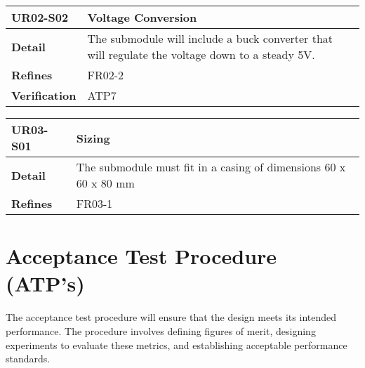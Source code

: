 \documentclass[class=report,11pt,crop=false]{standalone}
\begin{document}
 

\begin{table}
\centering

\begin{tabular}{| l | l |}
\hline
\textbf{UR02-S02} & \textbf{Voltage Conversion} \\
\hline
\textbf{Detail} & The submodule will include a buck converter that will regulate the voltage down to a steady 5V.  \\
\hline
\textbf{Refines} & FR02-2 \\
\hline
\textbf{Verification} & ATP7 \\
\hline

\end{tabular}

\end{table}

 

\begin{table}
\centering

\begin{tabular}{| l | l |}
\hline
\textbf{UR03-S01} & \textbf{Sizing} \\
\hline
\textbf{Detail} & The submodule must fit in a casing of dimensions 60 x 60 x 80 mm \\
\hline
\textbf{Refines} & FR03-1 \\
\hline

\end{tabular}

\end{table}

\section{Acceptance Test Procedure (ATP’s)}

The acceptance test procedure will ensure that the design meets its intended performance. The procedure involves defining figures of merit, designing experiments to evaluate these metrics, and establishing acceptable performance standards.
\end{document}
